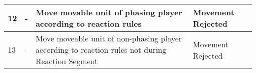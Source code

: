 \begin{center}
\begin{longtable}{| p{.5cm} | p{4.5cm} | p{4.5cm} | p{4.5cm} |}
    12 &
    
    - &
    
    Move movable unit of phasing player according to reaction rules &
    
    Movement Rejected
    
    \\ \hline 
    
    13 &
    
    - &
    
    Move moveable unit of non-phasing player according to reaction rules not during Reaction Segment &
    
    Movement Rejected
    
    \\ \hline 

  \end{longtable}

\end{center}
